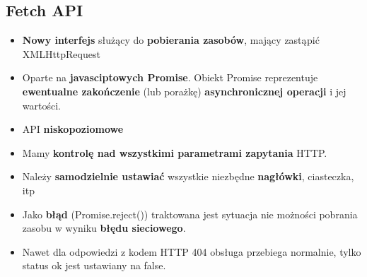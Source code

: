 \documentclass[../main.tex]{subfiles}
\begin{document}
    \subsection{Fetch API}
    \begin{itemize}
        \item \textbf{Nowy interfejs} służący do \textbf{pobierania zasobów}, mający zastąpić XMLHttpRequest
        \item Oparte na \textbf{javasciptowych Promise}. Obiekt Promise reprezentuje \textbf{ewentualne zakończenie} (lub porażkę) \textbf{asynchronicznej operacji} i jej wartości.
        \item API \textbf{niskopoziomowe}
        \item Mamy \textbf{kontrolę nad wszystkimi parametrami zapytania} HTTP.
        \item Należy \textbf{samodzielnie ustawiać} wszystkie niezbędne \textbf{nagłówki}, ciasteczka, itp
        \item Jako \textbf{błąd} (Promise.reject()) traktowana jest sytuacja nie możności pobrania
        zasobu w wyniku \textbf{błędu sieciowego}.
        \item Nawet dla odpowiedzi z kodem HTTP 404 obsługa przebiega normalnie, tylko
        status ok jest ustawiany na false.
    \end{itemize}
\end{document}
